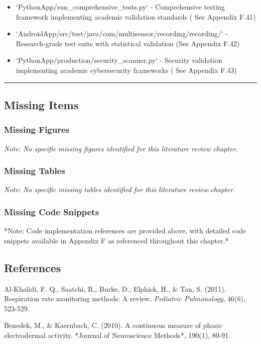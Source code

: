 \documentclass[11pt,a4paper]{article}
\begin{document}
\begin{itemize}
\item `PythonApp/run_comprehensive_tests.py` - Comprehensive testing framework implementing academic validation standards (
  See Appendix F.41)
\item `AndroidApp/src/test/java/com/multisensor/recording/recording/` - Research-grade test suite with statistical
  validation (See Appendix F.42)
\item `PythonApp/production/security_scanner.py` - Security validation implementing academic cybersecurity frameworks (
  See Appendix F.43)

\end{itemize}
\hrule

\subsection{Missing Items}

\subsubsection{Missing Figures}

\textit{Note: No specific missing figures identified for this literature review chapter.}

\subsubsection{Missing Tables}

\textit{Note: No specific missing tables identified for this literature review chapter.}

\subsubsection{Missing Code Snippets}

*Note: Code implementation references are provided above, with detailed code snippets available in Appendix F as
referenced throughout this chapter.*

\subsection{References}

Al-Khalidi, F. Q., Saatchi, R., Burke, D., Elphick, H., \& Tan, S. (2011). Respiration rate monitoring methods: A review.
\textit{Pediatric Pulmonology}, 46(6), 523-529.

Benedek, M., \& Kaernbach, C. (2010). A continuous measure of phasic electrodermal activity. *Journal of Neuroscience
Methods*, 190(1), 80-91.
\end{document}
